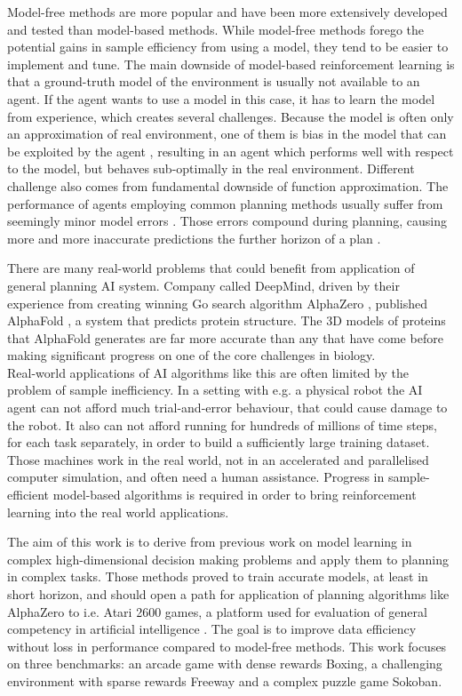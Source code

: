 Model-free methods are more popular and have been more extensively developed and tested than model-based methods. While model-free methods forego the potential gains in sample efficiency from using a model, they tend to be easier to implement and tune. The main downside of model-based reinforcement learning is that a ground-truth model of the environment is usually not available to an agent. If the agent wants to use a model in this case, it has to learn the model from experience, which creates several challenges. Because the model is often only an approximation of real environment, one of them is bias in the model that can be exploited by the agent \cite{Algo.WorldModels}, resulting in an agent which performs well with respect to the model, but behaves sub-optimally in the real environment. Different challenge also comes from fundamental downside of function approximation. The performance of agents employing common planning methods usually suffer from seemingly minor model errors  \cite{Study.PlanWithImperfectModel}. Those errors compound during planning, causing more and more inaccurate predictions the further horizon of a plan \cite{Study.CompoundingModelError}.

There are many real-world problems that could benefit from application of general planning AI system. Company called DeepMind, driven by their experience from creating winning Go search algorithm AlphaZero \cite{Algo.AlphaZero}, published AlphaFold \cite{Algo.AlphaFold}, a system that predicts protein structure. The 3D models of proteins that AlphaFold generates are far more accurate than any that have come before making significant progress on one of the core challenges in biology. \\
Real-world applications of AI algorithms like this are often limited by the problem of sample inefficiency. In a setting with e.g. a physical robot the AI agent can not afford much trial-and-error behaviour, that could cause damage to the robot. It also can not afford running for hundreds of millions of time steps, for each task separately, in order to build a sufficiently large training dataset. Those machines work in the real world, not in an accelerated and parallelised computer simulation, and often need a human assistance. Progress in sample-efficient model-based algorithms is required in order to bring reinforcement learning into the real world applications.

The aim of this work is to derive from previous work on model learning in complex high-dimensional decision making problems \cite{Algo.RecurrentEnvSim}\cite{Algo.JointFrameRewardPrediction}\cite{Algo.FastGenerativeModels}\cite{Algo.PlaNet} and apply them to planning in complex tasks. Those methods proved to train accurate models, at least in short horizon, and should open a path for application of planning algorithms like AlphaZero \cite{Algo.AlphaZero} to i.e. Atari 2600 games, a platform used for evaluation of general competency in artificial intelligence \cite{Benchmark.RevisitingALE}. The goal is to improve data efficiency without loss in performance compared to model-free methods. This work focuses on three benchmarks: an arcade game with dense rewards Boxing, a challenging environment with sparse rewards Freeway and a complex puzzle game Sokoban.
